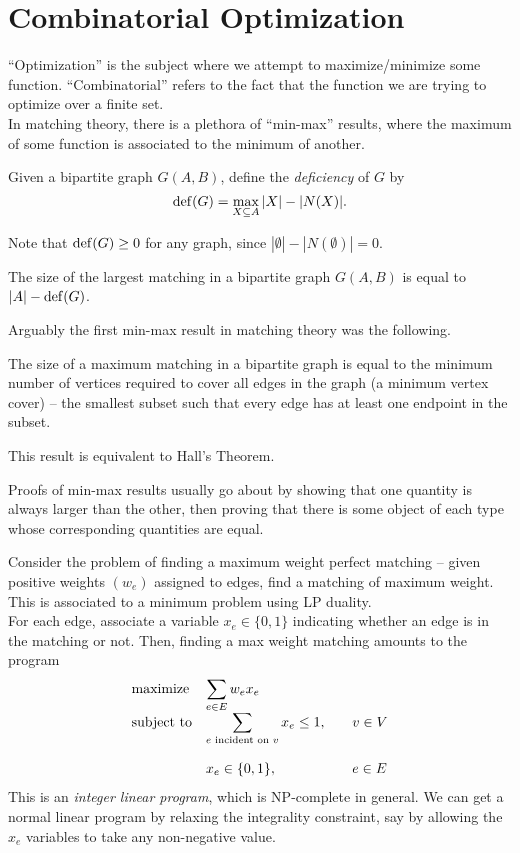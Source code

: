 
\section{Combinatorial Optimization}

	``Optimization'' is the subject where we attempt to maximize/minimize some function. ``Combinatorial'' refers to the fact that the function we are trying to optimize over a finite set.\\
	In matching theory, there is a plethora of ``min-max'' results, where the maximum of some function is associated to the minimum of another.

	\begin{fdef}
		Given a bipartite graph $G(A,B)$, define the \emph{deficiency} of $G$ by
		\[ \operatorname{def}(G) = \max_{X \subseteq A} |X| - |N(X)|. \]
	\end{fdef}
	Note that $\operatorname{def}(G) \ge 0$ for any graph, since $|\emptyset| - |N(\emptyset)| = 0$.

	\begin{fprop}
		The size of the largest matching in a bipartite graph $G(A,B)$ is equal to $|A| - \operatorname{def}(G)$.
	\end{fprop}

	Arguably the first min-max result in matching theory was the following.

	\begin{ftheo}
		\label{theo: konigs theorem}
		The size of a maximum matching in a bipartite graph is equal to the minimum number of vertices required to cover all edges in the graph (a minimum vertex cover) -- the smallest subset such that every edge has at least one endpoint in the subset.
	\end{ftheo}
	This result is equivalent to Hall's Theorem.

	Proofs of min-max results usually go about by showing that one quantity is always larger than the other, then proving that there is some object of each type whose corresponding quantities are equal.

	Consider the problem of finding a maximum weight perfect matching -- given positive weights $(w_e)$ assigned to edges, find a matching of maximum weight. This is associated to a minimum problem using LP duality.\\
	For each edge, associate a variable $x_e \in \{0,1\}$ indicating whether an edge is in the matching or not. Then, finding a max weight matching amounts to the program
	\[
	\begin{array}{ll@{}ll}
	\text{maximize}  & \displaystyle\sum_{e \in E} w_{e} x_{e} &\\
	\text{subject to}& \displaystyle\sum\limits_{e \text{ incident on } v} x_{e} \le 1,  &\qquad v \in V\\\\
	                 & x_{e} \in \{0,1\},                                                &\qquad e \in E
	\end{array}
	\]
	This is an \emph{integer linear program}, which is \textsf{NP}-complete in general. We can get a normal linear program by relaxing the integrality constraint, say by allowing the $x_e$ variables to take any non-negative value.

